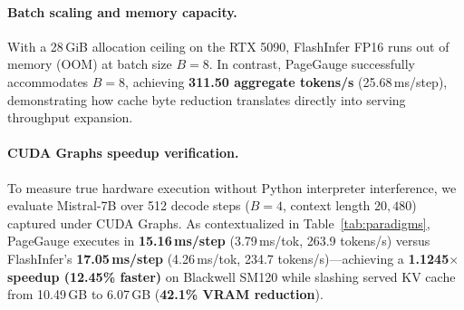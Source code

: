 \documentclass{article}
\begin{document}
\begin{table}[t]
\caption{Common-engine decoder pilot ($B=4$, context $20,480$, decode 1,536). Un-graphed Python dispatch exposes host launch overhead, which is resolved via graph capture.}
\label{tab:frontier}
\centering\small
{}
\end{table}

\paragraph{Batch scaling and memory capacity.}
With a 28\,GiB allocation ceiling on the RTX 5090, FlashInfer FP16 runs out of memory (OOM) at batch size $B=8$. In contrast, PageGauge successfully accommodates $B=8$, achieving \textbf{311.50 aggregate tokens/s} (25.68\,ms/step), demonstrating how cache byte reduction translates directly into serving throughput expansion.

\paragraph{CUDA Graphs speedup verification.}
To measure true hardware execution without Python interpreter interference, we evaluate Mistral-7B over 512 decode steps ($B=4$, context length $20,480$) captured under CUDA Graphs. As contextualized in Table~\ref{tab:paradigms}, PageGauge executes in \textbf{15.16\,ms/step} (3.79\,ms/tok, 263.9 tokens/s) versus FlashInfer's \textbf{17.05\,ms/step} (4.26\,ms/tok, 234.7 tokens/s)---achieving a \textbf{1.1245$\times$ speedup (12.45\% faster)} on Blackwell SM120 while slashing served KV cache from 10.49\,GB to 6.07\,GB (\textbf{42.1\% VRAM reduction}).
\end{document}
